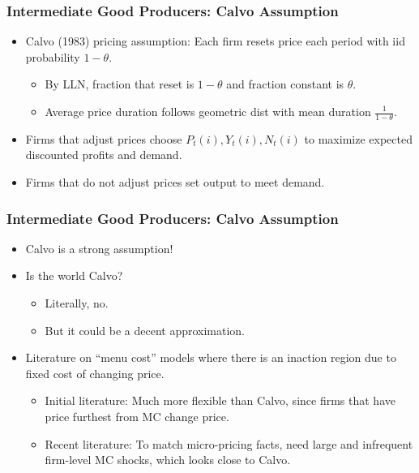 \documentclass[english,xcolor=svgnames]{beamer}
\begin{document}
\begin{frame}
\frametitle{Intermediate Good Producers: Calvo Assumption}
\begin{itemize}
	\item Calvo (1983) pricing assumption: Each firm resets price each period with iid probability $1 - \theta$.
	\begin{itemize}
		\item By LLN, fraction that reset is $1 - \theta$ and fraction constant is $\theta$.
		\item Average price duration follows geometric dist with mean
duration $\frac{1}{1-\theta}$.
	\end{itemize}
	\item Firms that adjust prices choose $P_t(i), Y_t(i), N_t(i)$ to maximize expected discounted profits and demand.
	\item Firms that do not adjust prices set output to meet demand.
\end{itemize}
\end{frame}


\begin{frame}
\frametitle{Intermediate Good Producers: Calvo Assumption}
\begin{itemize}
	\item Calvo is a strong assumption!
	\item Is the world Calvo?
	\begin{itemize}
			\item Literally, no.
			\item But it could be a decent approximation.
	\end{itemize}
	\item Literature on ``menu cost'' models where there is an inaction region due to fixed cost of changing price.
	\begin{itemize}
		\item Initial literature: Much more flexible than Calvo, since firms that have price furthest from MC change price.
		\item Recent literature: To match micro-pricing facts, need large and infrequent firm-level MC shocks, which looks close to Calvo.
	\end{itemize}
\end{itemize}
\end{frame}
\end{document}
